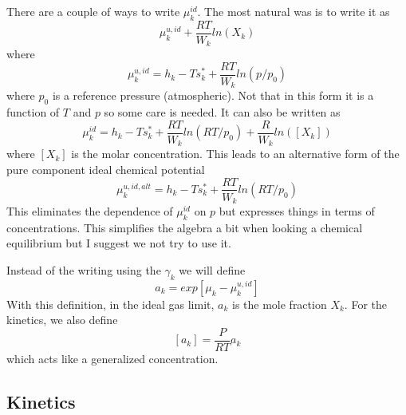 \documentclass[11pt]{article}
\begin{document}
There are a couple of ways to write $\mu_k^{id}$.
The most natural was is to write it as
\[
\mu_k^{u,id} + \frac{R T}{W_k} ln (X_k)
\]
where 
\begin{equation}
\mu_k^{u,id} = h_k - T s_k^* + \frac{R T}{W_k} ln(p/p_0)
\label{eq:chem_uid_frac}
\end{equation}
where $p_0$ is a reference pressure (atmospheric).
Not that in this form it is a function of $T$ and $p$ so some care is needed.
It can also be written as
\begin{equation}
\mu_k^{id} = h_k - T s_k^* + \frac{R T}{W_k} ln(RT/p_0) + \frac{R}{W_k} ln([X_k])
\end{equation}
where $[X_k]$ is the molar concentration.
This leads to an alternative form of the pure component ideal chemical potential
\begin{equation}
\mu_k^{u,id,alt} = h_k - T s_k^* + \frac{R T}{W_k} ln(RT/p_0)
\label{eq:chem_uid_conc}
\end{equation}
This eliminates the dependence of $\mu_k^{id}$ on $p$ but expresses things in terms of
concentrations.  This simplifies the algebra a bit when looking a chemical equilibrium but
I suggest we not try to use it.

Instead of the writing using the $\gamma_k$ we will define
\begin{equation}
a_k = exp[\mu_k - \mu_k^{u,id}]
\label{eq:deviate_ideal}
\end{equation}
With this definition, in the ideal gas limit, $a_k$ is the mole fraction $X_k$. For the kinetics,
we also define
\[
[a_k] = \frac{P}{R T}  a_k
\]
which acts like a generalized concentration.

\subsection{Kinetics}
\end{document}
